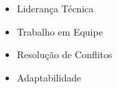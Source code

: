 %
%
%

\twocolumnsection
{
\begin{skills}
\end{skills}}
{
\vspace{1em}
\begin{itemize}
	\item Liderança Técnica
	\item Trabalho em Equipe                    
    \item Resolução de Conflitos
    \item Adaptabilidade
\end{itemize}
}
